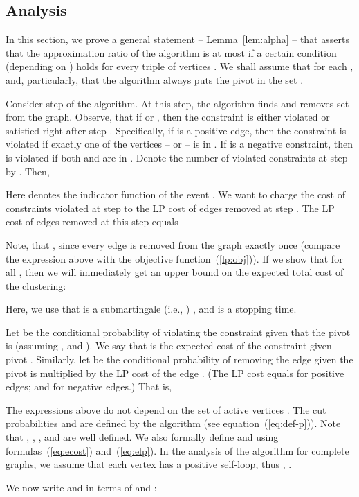 \documentclass[11pt]{article}
\theoremstyle{definition}
\theoremstyle{remark}
\begin{document}
\subsection{Analysis}
In this section, we prove a general statement -- Lemma~\ref{lem:alpha} -- that
asserts that the approximation ratio of the algorithm is at most  if a
certain condition (depending on ) holds for every triple of vertices
.  We shall assume that  for each , and, particularly, that the algorithm always puts the pivot  in
the set .

Consider step  of the algorithm. At this step, the algorithm finds and
removes set  from the graph. Observe, that if  or ,
then the constraint  is either violated or satisfied right after step
. Specifically, if  is a positive edge, then the constraint 
is violated if exactly one of the vertices --  or  -- is in . If
 is a negative constraint, then  is violated if both  and 
are in . Denote the number of violated constraints at step  by .
Then,

Here  denotes the indicator function of the event .  We want
to charge the cost of constraints violated at step  to the LP cost of edges
removed at step . The LP cost of edges removed at this step equals

Note, that , since every edge is removed from the graph
exactly once (compare the expression above with the objective
function~(\ref{lp:obj})).  If we show that  for all , then we will immediately get an upper bound on the
expected total cost of the clustering:

Here, we use that  is a
submartingale (i.e., ) , and  is a stopping time.

Let  be the conditional probability of violating the constraint
 given that the pivot  is  (assuming , and ). We say that  is the expected cost of the constraint 
given pivot . Similarly, let  be the conditional probability of
removing the edge  given the pivot is  multiplied by the LP cost of
the edge . (The LP cost equals  for positive edges; and
 for negative edges.) That is,

The expressions above do not depend on the set of active vertices .
The cut probabilities  and  are defined by the algorithm
(see equation~(\ref{eq:def-p})). Note
that , , , and  are
well defined. We also formally define  and  using
formulas~(\ref{eq:ecost}) and~(\ref{eq:elp}). In the analysis of the algorithm
for complete graphs, we assume that each vertex  has a positive self-loop,
thus , .


We now write  and  in terms of  and :
\end{document}
